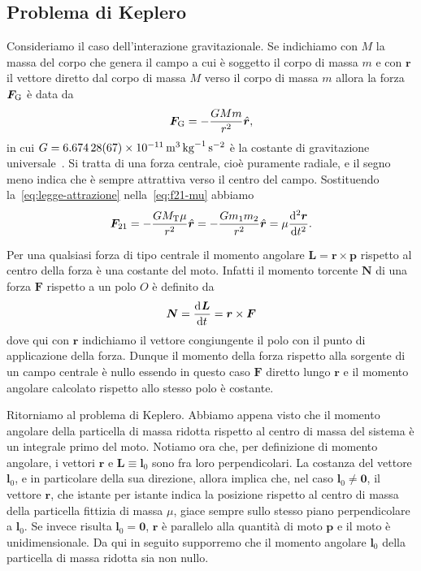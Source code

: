 \subsection{Problema di Keplero}

Consideriamo il caso dell'interazione gravitazionale. Se indichiamo con $M$ la
massa del corpo che genera il campo a cui è soggetto il corpo di massa $m$ e con
$\bm{r}$ il vettore diretto dal corpo di massa $M$ verso il corpo di massa $m$
allora la forza $\bm{F}_\textup{G}$ è data da
\begin{equation}
  \label{eq:legge-attrazione}
  \bm{F}_\textup{G} = -\frac{GMm}{r^2}\versor{r},
\end{equation}
in cui $G=\SI{6.674
  28(67)e-11}{\metre\tothe{3}\per\kilogram\per\second\squared}$ è la costante di
gravitazione universale~\cite{codata-costanti}. Si tratta di una forza centrale,
cioè puramente radiale, e il segno meno indica che è sempre attrattiva verso il
centro del campo. Sostituendo la~\eqref{eq:legge-attrazione}
nella~\eqref{eq:f21-mu} abbiamo
\begin{equation}
  \label{eq:forza-mu}
  \bm{F}_{21} = -\frac{GM_\textup{T}\mu}{r^2}\versor{r} =
  -\frac{Gm_1m_2}{r^2}\versor{r} = \mu\toder[2]{\bm{r}}{t}.
\end{equation}

Per una qualsiasi forza di tipo centrale il momento angolare
$\bm{L}=\bm{r}\times\bm{p}$ rispetto al centro della forza è una costante del
moto. Infatti il momento torcente $\bm{N}$ di una forza $\bm{F}$ rispetto a un
polo $O$ è definito da
\begin{equation}
  \bm{N}= \frac{{\mathop{}\!\mathrm{d}^{}}\bm{L}}{\mathop{}\!\mathrm{d} {t}^{}} = \bm{r}\times\bm{F}
\end{equation}
dove qui con $\bm{r}$ indichiamo il vettore congiungente il polo con il punto di
applicazione della forza. Dunque il momento della forza rispetto alla sorgente
di un campo centrale è nullo essendo in questo caso $\bm{F}$ diretto lungo
$\bm{r}$ e il momento angolare calcolato rispetto allo stesso polo è
costante.

Ritorniamo al problema di Keplero. Abbiamo appena visto che il momento angolare
della particella di massa ridotta rispetto al centro di massa del sistema è un
integrale primo del moto. Notiamo ora che, per definizione di momento angolare,
i vettori $\bm{r}$ e $\bm{L}\equiv\bm{l}_0$ sono fra loro perpendicolari. La
costanza del vettore $\bm{l}_0$, e in particolare della sua direzione, allora
implica che, nel caso $\bm{l}_0\neq\bm{0}$, il vettore $\bm{r}$, che istante per
istante indica la posizione rispetto al centro di massa della particella
fittizia di massa $\mu$, giace sempre sullo stesso piano perpendicolare a
$\bm{l}_0$. Se invece risulta $\bm{l}_0=\bm{0}$, $\bm{r}$ è parallelo alla
quantità di moto $\bm{p}$ e il moto è unidimensionale. Da qui in seguito
supporremo che il momento angolare $\bm{l}_0$ della particella di massa ridotta
sia non nullo.

